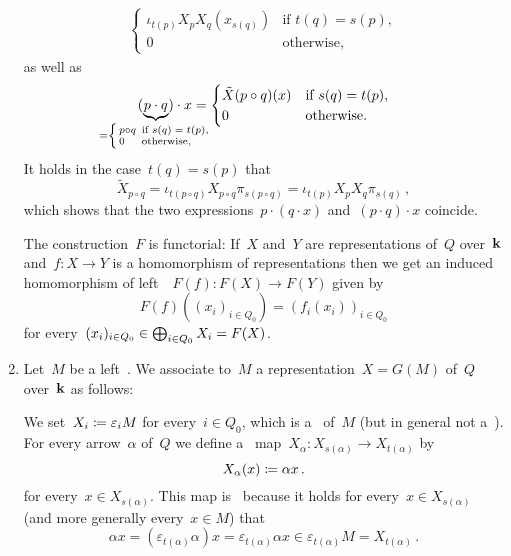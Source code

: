 \begin{remark}
\begin{enumerate}
\begin{align*}
\begin{cases}
            \iota_{t(p)} X_p X_q(x_{s(q)})  & \text{if~$t(q) = s(p)$}, \\
            0                               & \text{otherwise},
          \end{cases}
      \end{align*}
      as well as
      \[
          (
          \underbrace{ p \cdot q }_{\mathclap{
              = \left\{
                  \begingroup
                  \renewcommand{\thickspace}{\kern 0.4em} %
                  \begin{smallmatrix*}[l]
                    p \circ q & \text{if~$s(q) = t(p)$},  \\
                    0         & \text{otherwise},
                  \end{smallmatrix*}
                  \endgroup
                \right.
            }}
            )
            \cdot x
        =   \begin{cases}
              \tilde{X}{(p \circ q)}(x) & \text{if~$s(q) = t(p)$},  \\
              0                         & \text{otherwise}.
            \end{cases}
      \]
      It holds in the case~$t(q) = s(p)$ that
      \[
          \tilde{X}_{p \circ q}
        = \iota_{t(p \circ q)} X_{p \circ q} \pi_{s(p \circ q)}
        = \iota_{t(p)} X_p X_q \pi_{s(q)} \,,
      \]
      which shows that the two expressions~$p \cdot (q \cdot x)$ and~$(p \cdot q) \cdot x$ coincide.
      
      The construction~$F$ is functorial:
      If~$X$ and~$Y$ are representations of~$Q$ over~$\kf$ and~$f \colon X \to Y$ is a homomorphism of representations then we get an induced homomorphism of left~{}~$F(f) \colon F(X) \to F(Y)$ given by
      \[
          F(f)\left( (x_i)_{i \in Q_0} \right)
        = ( f_i(x_i) )_{i \in Q_0}
      \]
      for every~$(x_i)_{i \in Q_0} \in \bigoplus_{i \in Q_0} X_i = F(X)$.
      
    \item
      Let~$M$ be a left~{}.
      We associate to~$M$ a representation~$X = G(M)$ of~$Q$ over~$\kf$ as follows:
      
      We set~$X_i \coloneqq \varepsilon_i M$ for every~$i \in Q_0$, which is a~{\submodule{$\kf$}} of~$M$ (but in general not a~{}).
      For every arrow~$\alpha$ of~$Q$ we define a~{\klin} map~$X_\alpha \colon X_{s(\alpha)} \to X_{t(\alpha)}$ by
      \[
                  X_\alpha( x )
        \coloneqq  \alpha x \,.
      \]
      for every~$x \in X_{s(\alpha)}$.
      This map is~{\welldef} because it holds for every~$x \in X_{s(\alpha)}$ (and more generally every~$x \in M$) that
      \[
            \alpha x
        =   (\varepsilon_{t(\alpha)} \alpha) x
        =   \varepsilon_{t(\alpha)} \alpha x
        \in \varepsilon_{t(\alpha)} M
        =   X_{t(\alpha)} \,.
      \]
      

\end{enumerate}
\end{remark}
